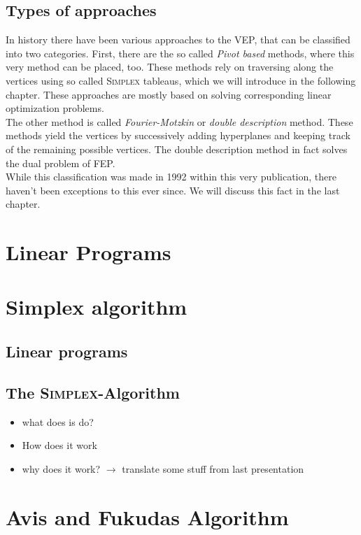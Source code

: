 \documentclass[a4paper, 11pt]{article}
\begin{document}
\subsection{Types of approaches}
In history there have been various approaches to the VEP, that can be classified into two categories. First, there are the so called \textit{Pivot based} methods, where this very method can be placed, too. These methods rely on traversing along the vertices using so called \textsc{Simplex} tableaus, which we will introduce in the following chapter. These approaches are mostly based on solving corresponding linear optimization problems.\\

The other method is called \textit{Fourier-Motzkin} or \textit{double description} method\cite{Motzkin}. These methods yield the vertices by successively adding hyperplanes and keeping track of the remaining possible vertices. The double description method in fact solves the dual problem of FEP. \\

While this classification was made in 1992 within this very publication, there haven't been exceptions to this ever since. We will discuss this fact in the last chapter.

\section{Linear Programs}
\section{Simplex algorithm}
\subsection{Linear programs}
\subsection{The \textsc{Simplex}-Algorithm}
\begin{itemize}
	\item what does is do?
	\item How does it work
	\item why does it work? $\rightarrow$ translate some stuff from last presentation
\end{itemize}

\section{Avis and Fukudas Algorithm}
\end{document}
